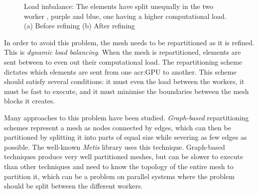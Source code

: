 \begin{figure}[H]
	\centering
	\hfill
	\caption{Load imbalance: The elements have split unequally in the two worker , purple and blue, one having a higher computational load. (a) Before refining (b) After refining}\label{fig:intro_load_balancing}
\end{figure}

In order to avoid this problem, the mesh needs to be repartitioned as it is refined. This is
\textit{dynamic load balancing}. When the mesh is repartitioned, elements are sent between
 to even out their computational load. The repartitioning scheme dictates which
elements are sent from one \acrshort{acr:GPU} to another. This scheme should satisfy several
conditions: it must even the load between the workers, it must be fast to execute, and it must
minimise the boundaries between the mesh blocks it creates. 

Many approaches to this problem have been studied. \textit{Graph-based} repartitioning schemes
represent a mesh as nodes connected by edges, which can then be partitioned by splitting it into
parts of equal size while severing as few edges as possible. The well-known
\textit{Metis}\cite{Karypis1998} library uses this technique. Graph-based techniques produce very
well partitioned meshes, but can be slower to execute than other techniques and need to know the
topology of the entire mesh to partition it, which can be a problem on parallel systems where the
problem should be split between the different workers.

